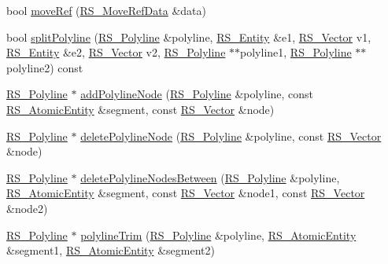 \begin{DoxyCompactItemize}
\item 
bool \hyperlink{classRS__Modification_ab6313d556f996f512e66e344bf447b53}{move\-Ref} (\hyperlink{classRS__MoveRefData}{R\-S\-\_\-\-Move\-Ref\-Data} \&data)
\item 
bool \hyperlink{classRS__Modification_a28169c495d09ed3f094b79fed44165f2}{split\-Polyline} (\hyperlink{classRS__Polyline}{R\-S\-\_\-\-Polyline} \&polyline, \hyperlink{classRS__Entity}{R\-S\-\_\-\-Entity} \&e1, \hyperlink{classRS__Vector}{R\-S\-\_\-\-Vector} v1, \hyperlink{classRS__Entity}{R\-S\-\_\-\-Entity} \&e2, \hyperlink{classRS__Vector}{R\-S\-\_\-\-Vector} v2, \hyperlink{classRS__Polyline}{R\-S\-\_\-\-Polyline} $\ast$$\ast$polyline1, \hyperlink{classRS__Polyline}{R\-S\-\_\-\-Polyline} $\ast$$\ast$polyline2) const 
\item 
\hyperlink{classRS__Polyline}{R\-S\-\_\-\-Polyline} $\ast$ \hyperlink{classRS__Modification_a7cab6428651d5ddc4120d167e9cd3686}{add\-Polyline\-Node} (\hyperlink{classRS__Polyline}{R\-S\-\_\-\-Polyline} \&polyline, const \hyperlink{classRS__AtomicEntity}{R\-S\-\_\-\-Atomic\-Entity} \&segment, const \hyperlink{classRS__Vector}{R\-S\-\_\-\-Vector} \&node)
\item 
\hyperlink{classRS__Polyline}{R\-S\-\_\-\-Polyline} $\ast$ \hyperlink{classRS__Modification_a92983dd2cc5ead78668074e7fd345d18}{delete\-Polyline\-Node} (\hyperlink{classRS__Polyline}{R\-S\-\_\-\-Polyline} \&polyline, const \hyperlink{classRS__Vector}{R\-S\-\_\-\-Vector} \&node)
\item 
\hyperlink{classRS__Polyline}{R\-S\-\_\-\-Polyline} $\ast$ \hyperlink{classRS__Modification_a40b1a6f42ae239399d64007092bcd971}{delete\-Polyline\-Nodes\-Between} (\hyperlink{classRS__Polyline}{R\-S\-\_\-\-Polyline} \&polyline, \hyperlink{classRS__AtomicEntity}{R\-S\-\_\-\-Atomic\-Entity} \&segment, const \hyperlink{classRS__Vector}{R\-S\-\_\-\-Vector} \&node1, const \hyperlink{classRS__Vector}{R\-S\-\_\-\-Vector} \&node2)
\item 
\hyperlink{classRS__Polyline}{R\-S\-\_\-\-Polyline} $\ast$ \hyperlink{classRS__Modification_af0a7bdecda52ef51395a1d7c8ee6ad32}{polyline\-Trim} (\hyperlink{classRS__Polyline}{R\-S\-\_\-\-Polyline} \&polyline, \hyperlink{classRS__AtomicEntity}{R\-S\-\_\-\-Atomic\-Entity} \&segment1, \hyperlink{classRS__AtomicEntity}{R\-S\-\_\-\-Atomic\-Entity} \&segment2)
\end{DoxyCompactItemize}
